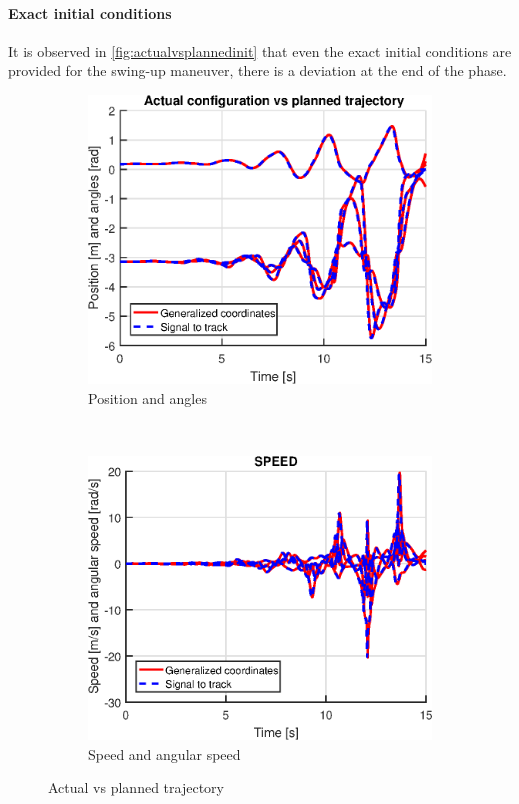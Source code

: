 \documentclass[a4paper,12pt]{article}
\begin{document}
\paragraph{Exact initial conditions}
It is observed in \autoref{fig:actualvsplannedinit} that even the exact initial conditions are provided for the swing-up maneuver, there is a deviation at the end of the phase.
\begin{figure}[H]
    \centering
    \begin{subfigure}[h]{0.48\textwidth}
        \centering
        \includegraphics[width=1\textwidth]{illustrations/graph_swingup_pos_init.eps}
        \caption{Position and angles}
    \end{subfigure}%
    ~
    \begin{subfigure}[h]{0.48\textwidth}
        \centering
        \includegraphics[width=1\textwidth]{illustrations/graph_swingup_speed_init.eps}
        \caption{Speed and angular speed}
    \end{subfigure}
    \caption{Actual vs planned trajectory}
    \label{fig:actualvsplannedinit}
\end{figure}
\end{document}
